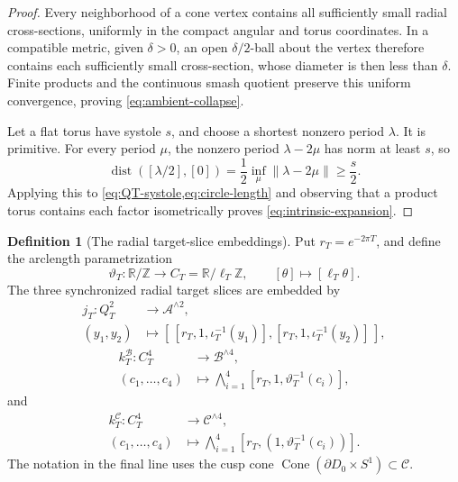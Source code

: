 \documentclass[11pt,letterpaper]{article}
\numberwithin{equation}{section}
\theoremstyle{definition}
\newtheorem{definition}[theorem]{Definition}
\theoremstyle{remark}
\newcommand{\R}{\mathbb R}
\newcommand{\Z}{\mathbb Z}
\newcommand{\Cone}{\operatorname{Cone}}
\begin{document}
\begin{proof}
Every neighborhood of a cone vertex contains all sufficiently small radial
cross-sections, uniformly in the compact angular and torus coordinates.
In a compatible metric, given $\delta>0$, an open $\delta/2$-ball about
the vertex therefore contains each sufficiently small cross-section, whose
diameter is then less than $\delta$.  Finite products and the continuous
smash quotient preserve this uniform convergence, proving
\cref{eq:ambient-collapse}.

Let a flat torus have systole $s$, and choose a shortest nonzero period
$\lambda$.  It is primitive.  For every period $\mu$, the nonzero period
$\lambda-2\mu$ has norm at least $s$, so
\[
 \operatorname{dist}([\lambda/2],[0])
 =\frac12\inf_\mu\|\lambda-2\mu\|\ge\frac{s}{2}.
\]
Applying this to \cref{eq:QT-systole,eq:circle-length} and observing that
a product torus contains each factor isometrically proves
\cref{eq:intrinsic-expansion}.
\end{proof}

\begin{definition}[The radial target-slice embeddings]
\label{def:target-slice-embeddings}
Put \(r_T=e^{-2\pi T}\), and define the arclength parametrization
\[
 \vartheta_T:\R/\Z\longrightarrow C_T=\R/\ell_T\Z,
 \qquad [\theta]\longmapsto[\ell_T\theta].
\]
The three synchronized radial target slices are embedded by
\begin{align*}
 j_T:Q_T^2&\longrightarrow\mathcal A^{\wedge2},\\
 (y_1,y_2)&\longmapsto
 [\,[r_T,1,\iota_T^{-1}(y_1)],
    [r_T,1,\iota_T^{-1}(y_2)]\,],
\end{align*}
\begin{align*}
 k_T^{\mathcal B}:C_T^4&\longrightarrow\mathcal B^{\wedge4},\\
 (c_1,\ldots,c_4)&\longmapsto
 \bigwedge_{i=1}^4
 [r_T,1,\vartheta_T^{-1}(c_i)],
\end{align*}
and
\begin{align*}
 k_T^{\mathcal C}:C_T^4&\longrightarrow\mathcal C^{\wedge4},\\
 (c_1,\ldots,c_4)&\longmapsto
 \bigwedge_{i=1}^4
 [r_T,(1,\vartheta_T^{-1}(c_i))].
\end{align*}
The notation in the final line uses the cusp cone
\(\Cone(\partial D_0\times S^1)\subset\mathcal C\).
\end{definition}
\end{document}
